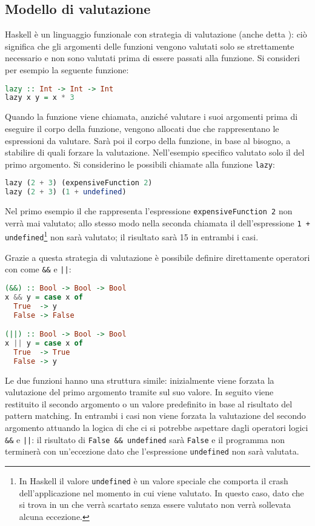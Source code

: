 \subsection{Modello di valutazione }
Haskell è un linguaggio funzionale con strategia di valutazione  (anche detta ): ciò significa che gli argomenti delle funzioni vengono valutati solo se strettamente necessario e non sono valutati prima di essere passati alla funzione. Si consideri per esempio la seguente funzione:
\begin{lstlisting}[language=haskell]
lazy :: Int -> Int -> Int
lazy x y = x * 3
\end{lstlisting}
Quando la funzione viene chiamata, anziché valutare i suoi argomenti prima di eseguire il corpo della funzione, vengono allocati due  che rappresentano le espressioni da valutare. Sarà poi il corpo della funzione, in base al bisogno, a stabilire di quali  forzare la valutazione. Nell'esempio specifico valutato solo il  del primo argomento. Si considerino le possibili chiamate alla funzione \lstinline{lazy}:
\begin{lstlisting}[language=haskell]
lazy (2 + 3) (expensiveFunction 2)
lazy (2 + 3) (1 + undefined)
\end{lstlisting}
Nel primo esempio il  che rappresenta l'espressione \lstinline{expensiveFunction 2} non verrà mai valutato; allo stesso modo nella seconda chiamata il  dell'espressione \lstinline{1 + undefined}\footnote{In Haskell il valore \lstinline{undefined} è un valore speciale che comporta il crash dell'applicazione nel momento in cui viene valutato. In questo caso, dato che si trova in un  che verrà scartato senza essere valutato non verrà sollevata alcuna eccezione.} non sarà valutato; il risultato sarà 15 in entrambi i casi.

Grazie a questa strategia di valutazione è possibile definire direttamente operatori con  come \lstinline{&&} e \lstinline{||}:
\begin{lstlisting}[language=haskell]
(&&) :: Bool -> Bool -> Bool
x && y = case x of
  True  -> y
  False -> False 

(||) :: Bool -> Bool -> Bool
x || y = case x of
  True  -> True
  False -> y
\end{lstlisting}
Le due funzioni hanno una struttura simile: inizialmente viene forzata la valutazione del primo argomento tramite  sul suo valore. In seguito viene restituito il secondo argomento o un valore predefinito in base al risultato del pattern matching. In entrambi i casi non viene forzata la valutazione del secondo argomento attuando la logica di  che ci si potrebbe aspettare dagli operatori logici \lstinline{&&} e \lstinline{||}: il risultato di \lstinline{False && undefined} sarà \lstinline{False} e il programma non terminerà con un'eccezione dato che l'espressione \lstinline{undefined} non sarà valutata.

